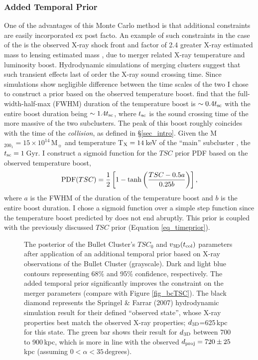 \subsubsection{Added Temporal Prior}\label{sec_addedprior}

One of the advantages of this Monte Carlo method is that additional constraints are easily incorporated ex post facto.
An example of such constraints in the case of the  is the observed X-ray shock front and factor of 2.4 greater X-ray estimated mass to lensing estimated mass \citep{Markevitch:2006wv}, due to merger related X-ray temperature and luminosity boost.  
Hydrodynamic simulations of merging clusters \citep[e.g.][]{Ricker:2001ju,Randall:2002kk} suggest that such transient effects last of order the X-ray sound crossing time.
Since simulations show negligible difference between the time scales of the two I chose to construct a prior based on the observed temperature boost.
\citet{Randall:2002kk} find that the full-width-half-max (FWHM) duration of the temperature boost is $\sim 0.4 t_{\rm sc}$ with the entire boost duration being $\sim 1.4 t_{\rm sc}$, where $t_{\rm sc}$ is the sound crossing time of the more massive of the two subclusters.
The peak of this boost roughly coincides with the time of the \emph{collision}, as defined in \S\ref{sec_intro}.
Given the M$_{200_1}=15 \times 10^{14}$\,M$_\sun$ and temperature T$_{\rm X}=14$\,keV of the ``main'' subcluster \citep{Markevitch:2006wv}, the $t_{\rm sc}=1$\,Gyr.
I construct a sigmoid function for the $TSC$ prior PDF based on the observed temperature boost, 
\begin{displaymath}
{\rm PDF}(TSC) = \frac{1}{2}\left[1-\tanh\left(\frac{TSC-0.5 a}{0.25 b} \right)\right],
\end{displaymath}
where $a$ is the FWHM of the duration of the temperature boost and $b$ is the entire boost duration.
I chose a sigmoid function over a simple step function since the temperature boost predicted by \citet{Randall:2002kk} does not end abruptly.
This prior is coupled with the previously discussed $TSC$ prior (Equation \ref{eq_timeprior}).

\begin{figure}
\caption{
The posterior of the Bullet Cluster's $TSC_0$ and $v_{\rm 3D}(t_{\rm col})$ parameters after application of an additional temporal prior based on X-ray observations of the Bullet Cluster (grayscale).  
Dark and light blue contours representing 68\% and 95\% confidence, respectively.
The added temporal prior significantly improves the constraint on the merger parameters (compare with Figure \ref{fig_bcTSC}).
The black diamond represents the Springel \& Farrar (2007) hydrodynamic simulation result for their defined ``observed state'', whose X-ray properties best match the observed X-ray properties; $d_{\rm 3D}$=625\,kpc for this state.
The green bar shows their result for $d_{\rm 3D}$ between 700 to 900\,kpc, which is more in line with the observed $d_{\rm proj} = 720\pm 25$\,kpc (assuming $0<\alpha<35$\,degrees).
\label{fig_bcTSC_added}}
\end{figure}

